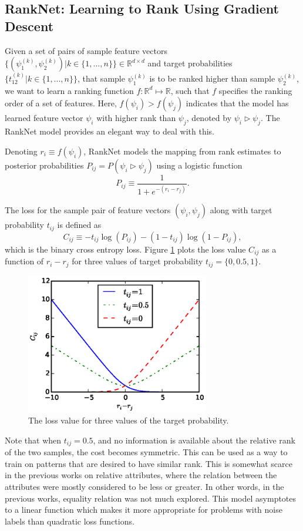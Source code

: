 \subsection{RankNet: Learning to Rank Using Gradient Descent}\label{sec3.1}
Given a set of pairs of sample feature vectors $\big\{( \psi_{1}^{(k)}, \psi_{2}^{(k)} ) | k \in \{1, ...,n\} \big\} \in \mathbb{R}^{d \times d}$ and target probabilities $\big\{ t_{12}^{(k)} | k \in \{1, ...,n\} \big\}$, that sample $\psi_{1}^{(k)}$ is to be ranked higher than sample $\psi_{2}^{(k)}$, we want to learn a ranking function $f : \mathbb{R}^d \mapsto \mathbb{R}$, such that %
$f$ specifies the ranking order of a set of features. Here, $f(\psi_i) > f(\psi_j)$ indicates that the model has learned feature vector $\psi_i$ with higher rank than $\psi_j$, denoted by $\psi_i \triangleright \psi_j$. The RankNet model \cite{Burges2005} provides an elegant way to deal with this.

Denoting $r_i \equiv f(\psi_i)$, RankNet models the mapping from rank estimates to posterior probabilities $P_{ij} = P(\psi_i \triangleright \psi_j)$ using a logistic function 
$$
P_{ij} \equiv \frac{1}{1 + e^{-(r_i - r_j)}}.
$$

The loss for the sample pair of feature vectors $(\psi_i, \psi_j)$ along with target probability $t_{ij}$ is defined as
$$
C_{ij} \equiv - t_{ij} \log (P_{ij}) - (1 - t_{ij}) \log (1 - P_{ij}),
$$
which is the binary cross entropy loss.
Figure \ref{fig.2} plots the loss value $C_{ij}$ as a function of $r_i - r_j$ for three values of target probability $t_{ij} = \{0, 0.5, 1\}$.

\begin{figure}
\centering
\includegraphics[width=8cm]{fig2-2/fig3.eps}
\caption{The loss value for three values of the target probability.}
\label{fig.2}
\end{figure}

Note that when $t_{ij} = 0.5$, and no information is available about the relative rank of the two samples, the cost becomes symmetric. This can be used as a way to train on patterns that are desired to have similar rank. This is somewhat scarce in the previous works on relative attributes, where the relation between the attributes were mostly considered to be less or greater. In other words, in the previous works, equality relation was not much explored.
This model asymptotes to a linear function which makes it more appropriate for problems with noise labels than quadratic loss functions.

